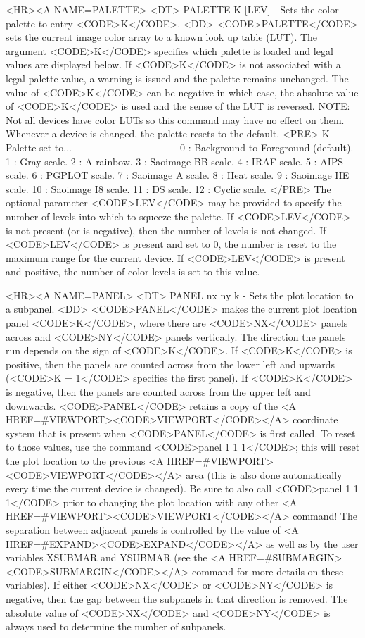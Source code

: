 \begin{rawhtml}
<HR><A NAME=PALETTE>
<DT>
PALETTE K [LEV] - Sets the color palette to entry <CODE>K</CODE>.
<DD>
	<CODE>PALETTE</CODE> sets the current image color array to a
	known look up table (LUT).  The argument <CODE>K</CODE> specifies
	which palette is loaded and legal values are displayed below.
	If <CODE>K</CODE> is not associated with a legal palette value,
	a warning is issued and the palette remains unchanged.  The
	value of <CODE>K</CODE> can be negative in which case, the
	absolute value of <CODE>K</CODE> is used and the sense of the LUT
	is reversed.
	NOTE: Not all devices have color LUTs so this
	command may have no effect on them.  Whenever a device is
	changed, the palette resets to the default.
	<PRE>
    K   Palette set to...
-------------------------------
    0 : Background to Foreground (default).
    1 : Gray scale.
    2 : A rainbow.
    3 : Saoimage BB scale.
    4 : IRAF scale.
    5 : AIPS scale.
    6 : PGPLOT scale.
    7 : Saoimage A scale.
    8 : Heat scale.
    9 : Saoimage HE scale.
   10 : Saoimage I8 scale.
   11 : DS scale.
   12 : Cyclic scale.
	</PRE>
	The optional parameter <CODE>LEV</CODE> may be provided to
	specify the number of levels into which to squeeze the palette.
	If <CODE>LEV</CODE> is not present (or is negative), then the
	number of levels is not changed.  If <CODE>LEV</CODE> is present
	and set to 0, the number is reset to the maximum range for the
	current device.  If <CODE>LEV</CODE> is present and positive,
	the number of color levels is set to this value.

<HR><A NAME=PANEL>
<DT>
PANEL nx ny k - Sets the plot location to a subpanel.
<DD>
	<CODE>PANEL</CODE> makes the current plot location panel
	<CODE>K</CODE>, where there are <CODE>NX</CODE> panels across
	and <CODE>NY</CODE> panels vertically.  The direction the panels
	run depends on the sign of <CODE>K</CODE>.  If <CODE>K</CODE> is
	positive, then the panels are counted across from the lower left
	and upwards (<CODE>K = 1</CODE> specifies the first panel).  If
	<CODE>K</CODE> is negative, then the panels are counted across
	from the upper left and downwards.  <CODE>PANEL</CODE> retains a
	copy of the <A HREF=#VIEWPORT><CODE>VIEWPORT</CODE></A> coordinate
	system that is present when <CODE>PANEL</CODE> is first called.
	To reset to those values, use the command <CODE>panel 1 1 1</CODE>;
	this will reset the plot location to the previous
	<A HREF=#VIEWPORT><CODE>VIEWPORT</CODE></A> area (this is also
	done automatically every time the current device is changed).
	Be sure to also call <CODE>panel 1 1 1</CODE> prior to changing
	the plot location with any other
	<A HREF=#VIEWPORT><CODE>VIEWPORT</CODE></A> command!  The
	separation between adjacent panels is controlled by the value of
	<A HREF=#EXPAND><CODE>EXPAND</CODE></A> as well as by the user
	variables XSUBMAR and YSUBMAR (see the
	<A HREF=#SUBMARGIN><CODE>SUBMARGIN</CODE></A> command for more
	details on these variables).  If either <CODE>NX</CODE> or
	<CODE>NY</CODE> is negative, then the gap between the subpanels in
	that direction is removed.  The absolute value of <CODE>NX</CODE>
	and <CODE>NY</CODE> is always used to determine the number of subpanels.


\end{rawhtml}
